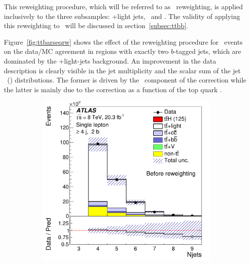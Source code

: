 This reweighting procedure, which will be referred to as \ttbar\ reweighting, is applied inclusively to the three subsamples: \ttbar+light jets, \ttbb\ and \ttcc. 
The validity of applying this reweighting to \ttHF\ will be discussed in section~\ref{subsec:ttbb}.

Figure~\ref{fig:ttbarseqrw} shows the effect  of the reweighting procedure for \ttbar\ events on the data/MC agreement in regions with exactly two $b$-tagged jets,
which are dominated by the \ttbar+light-jets background.
An improvement in the data description is clearly visible in the jet multiplicity and the scalar sum of the jet \pt\ (\hthad) distributions.
The former is driven by the \ttbarpt\ component of the correction while the latter is mainly due to the correction as a function of the top quark \pT.

\begin{figure}[!tp]
\begin{center}
  \begin{subfigure}{0.49\textwidth}{\includegraphics[width=\textwidth]{Modeling/Figures/fig_05a.pdf}}\label{fig:ttbarseqrw_a}
    \caption{}\end{subfigure}

\end{center}
\end{figure}
